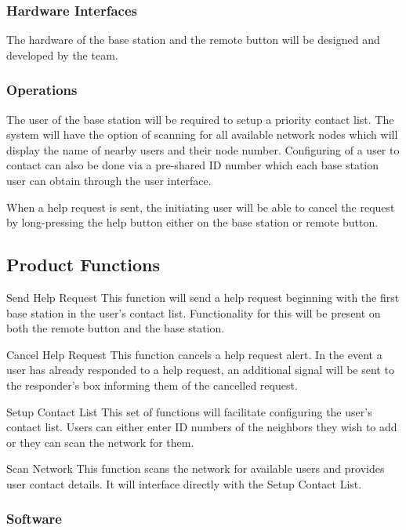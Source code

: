 \documentclass[journal,compsoc]{IEEEtran}
\begin{document}
\subsubsection{Hardware Interfaces}
The hardware of the base station and the remote button will be designed and developed by the team.

\subsubsection{Operations}
The user of the base station will be required to setup a priority contact list.  The system will have the option of scanning for all available network nodes which will display the name of nearby users and their node number.  Configuring of a user to contact can also be done via a pre-shared ID number which each base station user can obtain through the user interface.

When a help request is sent, the initiating user will be able to cancel the request by long-pressing the help button either on the base station or remote button.

\subsection{Product Functions}

\begin{LaTeXdescription}
\item[Send Help Request] This function will send a help request beginning with the first base station in the user’s contact list. Functionality for this will be present on both the remote button and the base station.
\item[Cancel Help Request] This function cancels a help request alert. In the event a user has already responded to a help request, an additional signal will be sent to the responder’s box informing them of the cancelled request.
\item[Setup Contact List] This set of functions will facilitate configuring the user’s contact list.  Users can either enter ID numbers of the neighbors they wish to add or they can scan the network for them.
\item[Scan Network] This function scans the network for available users and provides user contact details. It will interface directly with the Setup Contact List.
\end{LaTeXdescription}

\subsubsection{Software}
\end{document}
